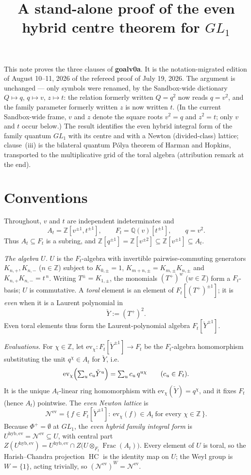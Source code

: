 \documentclass[11pt]{article}
\title{\textbf{A stand-alone proof of the even hybrid centre theorem for $GL_1$}}
\author{}
\date{}
\newcommand{\At}{A_t}
\newcommand{\Ft}{F_t}
\newcommand{\Nev}{\mathcal N^{\mathrm{ev}}}
\newcommand{\Uev}{U^{\mathrm{hyb,ev}}}
\newcommand{\HC}{\operatorname{HC}}
\newcommand{\Yc}{\check Y}
\newcommand{\Z}{\mathbb Z}
\newcommand{\ev}{\mathrm{ev}}
\begin{document}
\maketitle

\noindent
This note proves the three clauses of \textbf{goalv0a}. It is the
notation-migrated edition of August 10--11, 2026 of the refereed proof of July 19,
2026. The argument is unchanged --- only symbols were renamed, by the Sandbox-wide
dictionary $Q\mapsto q$, $q\mapsto v$, $z\mapsto t$: the relation formerly written
$Q=q^{2}$ now reads $q=v^{2}$, and the family parameter formerly written $z$ is now
written $t$. (In the current Sandbox-wide frame, $v$ and $z$ denote the square roots
$v^{2}=q$ and $z^{2}=t$; only $v$ and $t$ occur below.) The result identifies the
even hybrid integral form of the family quantum $GL_1$ with its centre and with a
Newton (divided-class) lattice; clause~(iii) is the bilateral quantum P\'olya
theorem of Harman and Hopkins, transported to the multiplicative grid of the
toral algebra (attribution remark at the end).

\section{Conventions}

Throughout, $v$ and $t$ are independent indeterminates and
\[
  \At=\Z[v^{\pm1},t^{\pm1}],\qquad
  \Ft=\mathbb Q(v)[t^{\pm1}],\qquad
  q=v^{2}.
\]
Thus $\At\subseteq\Ft$ is a subring, and $\Z[q^{\pm1}]=\Z[v^{\pm2}]\subseteq
\Z[v^{\pm1}]\subseteq\At$.

\emph{The algebra $U$.}\;
$U$ is the $\Ft$-algebra with invertible pairwise-commuting generators
$K_{n,+},K_{n,-}$ ($n\in\Z$) subject to
$K_{0,\pm}=1$, $K_{m+n,\pm}=K_{m,\pm}K_{n,\pm}$ and $K_{n,+}K_{n,-}=t^{\,n}$.
Writing $T^{\pm}=K_{1,\pm}$, the monomials $(T^{+})^{w}$ ($w\in\Z$) form a
$\Ft$-basis; $U$ is commutative. A \emph{toral} element is an element of
$\Ft[(T^{+})^{\pm1}]$; it is \emph{even} when it is a Laurent polynomial in
\[
  \Yc:=(T^{+})^{2}.
\]
Even toral elements thus form the Laurent-polynomial algebra
$\Ft[\Yc^{\pm1}]$.

\emph{Evaluations.}\;
For $\chi\in\Z$, let $\ev_\chi\colon\Ft[\Yc^{\pm1}]\to\Ft$ be the
$\Ft$-algebra homomorphism substituting the unit $q^{\chi}\in\At$ for $\Yc$,
i.e.
\[
  \ev_\chi\Bigl(\textstyle\sum_{u}c_u\Yc^{u}\Bigr)=\sum_u c_u\,q^{u\chi}
  \qquad(c_u\in\Ft).
\]
It is the unique $\At$-linear ring homomorphism with $\ev_\chi(\Yc)=q^{\chi}$,
and it fixes $\Ft$ (hence $\At$) pointwise. The \emph{even Newton lattice} is
\[
  \Nev=\bigl\{\,f\in\Ft[\Yc^{\pm1}]:\ \ev_\chi(f)\in\At\ \text{for every }
  \chi\in\Z\,\bigr\}.
\]
Because $\Phi^{+}=\emptyset$ at $GL_1$, the \emph{even hybrid family integral
form} is $\Uev=\Nev\subseteq U$, with central part
$Z(\Uev)=\Uev\cap Z\bigl(U\otimes_{\Ft}\operatorname{Frac}(\At)\bigr)$. Every
element of $U$ is toral, so the Harish--Chandra projection $\HC$ is the identity
map on $U$; the Weyl group is $W=\{1\}$, acting trivially, so
$(\Nev)^{W}=\Nev$.
\end{document}
